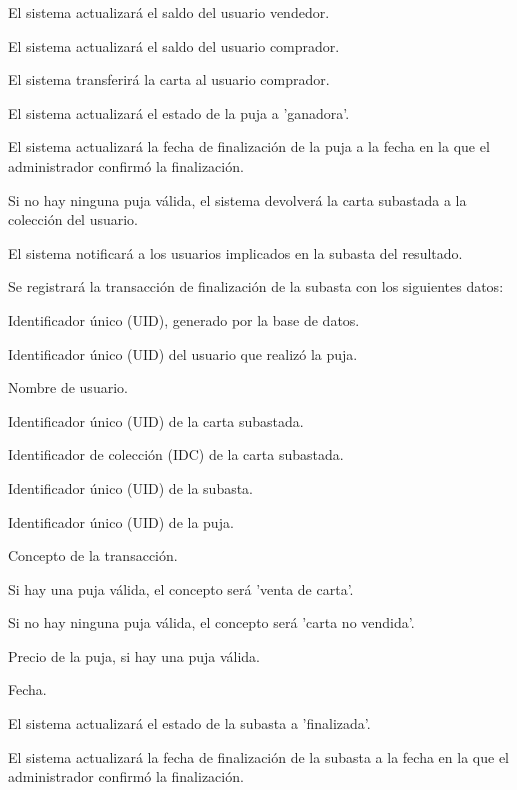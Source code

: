 \begin{RFSubastas}
\begin{RFSubastas}
\begin{RFSubastas}
\begin{RFSubastas}
				\item El sistema actualizará el saldo del usuario vendedor.
				\item El sistema actualizará el saldo del usuario comprador.
				\item El sistema transferirá la carta al usuario comprador.
				\item El sistema actualizará el estado de la puja a 'ganadora'.
				\item El sistema actualizará la fecha de finalización de la puja a la fecha en la que el administrador confirmó la finalización.
			\end{RFSubastas}

			\item Si no hay ninguna puja válida, el sistema devolverá la carta subastada a la colección del usuario.
		\end{RFSubastas}
		\item El sistema notificará a los usuarios implicados en la subasta del resultado.
	
		\item Se registrará la transacción de finalización de la subasta con los siguientes datos:
			\begin{RFSubastas}
				\item Identificador único (UID), generado por la base de datos.
				\item Identificador único (UID) del usuario que realizó la puja.
				\item Nombre de usuario.
				\item Identificador único (UID) de la carta subastada.
				\item Identificador de colección (IDC) de la carta subastada.
				\item Identificador único (UID) de la subasta.
				\item Identificador único (UID) de la puja.
				\item Concepto de la transacción.
				\begin{RFSubastas}
					\item Si hay una puja válida, el concepto será 'venta de carta'.
					\item Si no hay ninguna puja válida, el concepto será 'carta no vendida'.
				\end{RFSubastas}
				\item Precio de la puja, si hay una puja válida.
				\item Fecha.
			\end{RFSubastas}
		\item El sistema actualizará el estado de la subasta a 'finalizada'.
		\item El sistema actualizará la fecha de finalización de la subasta a la fecha en la que el administrador confirmó la finalización.
	
	\end{RFSubastas}
	
	
\end{RFSubastas}